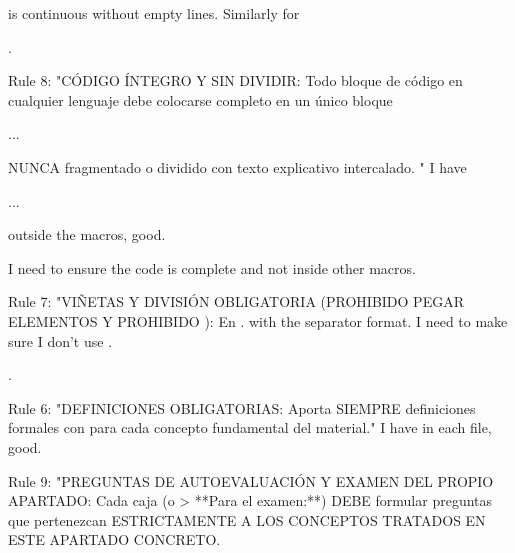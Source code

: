  is continuous without empty lines. Similarly for 


.

Rule 8: "CÓDIGO ÍNTEGRO Y SIN DIVIDIR: Todo bloque de código en cualquier lenguaje debe colocarse completo en un único bloque

\begin{codigo} ...
\end{codigo}



NUNCA fragmentado o dividido con texto explicativo intercalado. " I have \cmd{}

\begin{codigo}...
\end{codigo}



 outside the macros, good.

I need to ensure the code is complete and not inside other macros.

Rule 7: "VIÑETAS Y DIVISIÓN OBLIGATORIA (PROHIBIDO PEGAR ELEMENTOS Y PROHIBIDO ): En .  with the \cmd{|} separator format. I need to make sure I don't use \cmd{}.

.

Rule 6: "DEFINICIONES OBLIGATORIAS: Aporta SIEMPRE definiciones formales con para cada concepto fundamental del material." I have  in each file, good.

Rule 9: "PREGUNTAS DE AUTOEVALUACIÓN Y EXAMEN DEL PROPIO APARTADO: Cada caja  (o > **Para el examen:**) DEBE formular preguntas que pertenezcan ESTRICTAMENTE A LOS CONCEPTOS TRATADOS EN ESTE APARTADO CONCRETO.

